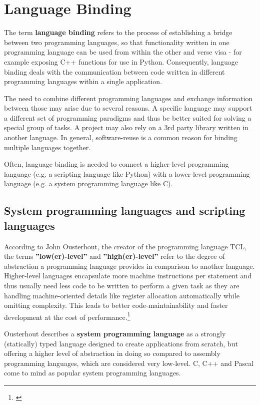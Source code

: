 \chapter{Language Binding}
\label{chap:LanguageBinding}

The term \textbf{language binding} refers to the process of establishing a bridge between two programming languages, so that functionality written in one programming language can be used from within the other and verse visa - for example exposing C++ functions for use in Python. Consequently, language binding deals with the communication between code written in different programming languages within a single application.

The need to combine different programming languages and exchange information between those may arise due to several reasons. A specific language may support a different set of programming paradigms and thus be better suited for solving a special group of tasks. A project may also rely on a 3rd party library written in another language. In general, software-reuse is a common reason for binding multiple languages together.

Often, language binding is needed to connect a higher-level programming language (e.g. a scripting language like Python) with a lower-level programming language (e.g. a system programming language like C).

\section{System programming languages and scripting languages}

According to John Ousterhout, the creator of the programming language TCL, the terms \textbf{''low(er)-level''} and \textbf{''high(er)-level''} refer to the degree of abstraction a programming language provides in comparison to another language. Higher-level languages encapsulate more machine instructions per statement and thus usually need less code to be written to perform a given task as they are handling machine-oriented details like register allocation automatically while omitting complexity. This leads to better code-maintainability and faster development at the cost of performance.\footnote{\citep{Ousterhout}}

Ousterhout describes a \textbf{system programming language} as a strongly (statically) typed language designed to create applications from scratch, but offering a higher level of abstraction in doing so compared to assembly programming languages, which are considered very low-level. C, C++ and Pascal come to mind as popular system programming languages.

